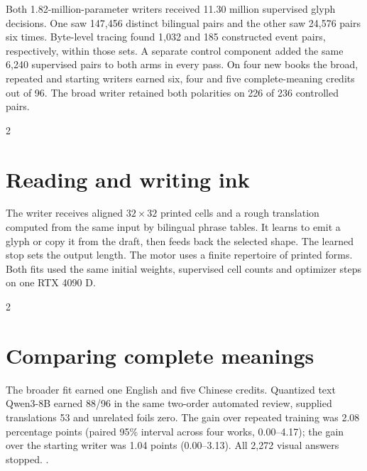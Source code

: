 \noindent Both 1.82-million-parameter writers received 11.30 million supervised glyph decisions. One saw 147,456 distinct bilingual pairs and the other saw 24,576 pairs six times. Byte-level tracing found 1,032 and 185 constructed event pairs, respectively, within those sets. A separate control component added the same 6,240 supervised pairs to both arms in every pass. On four new books the broad, repeated and starting writers earned six, four and five complete-meaning credits out of 96. The broad writer retained both polarities on 226 of 236 controlled pairs.
\begin{multicols}{2}
\section*{Reading and writing ink}
The writer receives aligned $32\times32$ printed cells and a rough translation computed from the same input by bilingual phrase tables. It learns to emit a glyph or copy it from the draft, then feeds back the selected shape. The learned stop sets the output length. The motor uses a finite repertoire of printed forms. Both fits used the same initial weights, supervised cell counts and optimizer steps on one RTX 4090 D.
\end{multicols}
\begin{multicols}{2}
\section*{Comparing complete meanings}
The broader fit earned one English and five Chinese credits. Quantized text Qwen3-8B earned 88/96 in the same two-order automated review, supplied translations 53 and unrelated foils zero. The gain over repeated training was 2.08 percentage points (paired 95\% interval across four works, 0.00--4.17); the gain over the starting writer was 1.04 points (0.00--3.13). All 2,272 visual answers stopped. .
\end{multicols}
